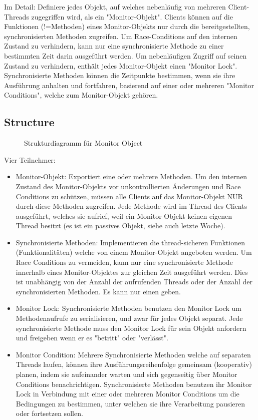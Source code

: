 Im Detail: Definiere jedes Objekt, auf welches nebenläufig von mehreren Client-Threads zugegriffen wird, als ein "Monitor-Objekt". Clients können auf die Funktionen (!=Methoden) eines Monitor-Objekts nur durch die bereitgestellten, synchronisierten Methoden zugreifen. Um Race-Conditions auf den internen Zustand zu verhindern, kann nur eine synchronisierte Methode zu einer bestimmten Zeit darin ausgeführt werden. Um nebenläufigen Zugriff auf seinen Zustand zu verhindern, enthält jedes Monitor-Objekt einen "Monitor Lock". Synchronisierte Methoden können die Zeitpunkte bestimmen, wenn sie ihre Ausführung anhalten und fortfahren, basierend auf einer oder mehreren "Monitor Conditions", welche zum Monitor-Objekt gehören.
\subsection{Structure}
\begin{figure}[H]
  \centering
  
  \caption{Strukturdiagramm f\"ur Monitor Object}
\end{figure}
Vier Teilnehmer:
\begin{itemize}
  \item Monitor-Objekt: Exportiert eine oder mehrere Methoden. Um den internen Zustand des Monitor-Objekts vor unkontrollierten Änderungen und Race Conditions zu schützen, müssen alle Clients auf das Monitor-Objekt NUR durch diese Methoden zugreifen. Jede Methode wird im Thread des Clients ausgeführt, welches sie aufrief, weil ein Monitor-Objekt keinen eigenen Thread besitzt (es ist ein passives Objekt, siehe auch letzte Woche).
  \item Synchronisierte Methoden: Implementieren die thread-sicheren Funktionen (Funktionalitäten) welche von einem Monitor-Objekt angeboten werden. Um Race Conditions zu vermeiden, kann nur eine synchronisierte Methode innerhalb eines Monitor-Objektes zur gleichen Zeit ausgeführt werden. Dies ist unabhängig von der Anzahl der aufrufenden Threads oder der Anzahl der synchronisierten Methoden. Es kann nur einen geben.
  \item Monitor Lock: Synchronisierte Methoden benutzen den Monitor Lock um Methodenaufrufe zu serialisieren, und zwar für jedes Objekt separat. Jede synchronisierte Methode muss den Monitor Lock für sein Objekt anfordern und freigeben wenn er es "betritt" oder "verlässt".
  \item Monitor Condition: Mehrere Synchronisierte Methoden welche auf separaten Threads laufen, können ihre Ausführungsreihenfolge gemeinsam (kooperativ) planen, indem sie aufeinander warten und sich gegenseitig über Monitor Conditions benachrichtigen. Synchronisierte Methoden benutzen ihr Monitor Lock in Verbindung mit einer oder mehreren Monitor Conditions um die Bedingungen zu bestimmen, unter welchen sie ihre Verarbeitung pausieren oder fortsetzen sollen.
\end{itemize}

